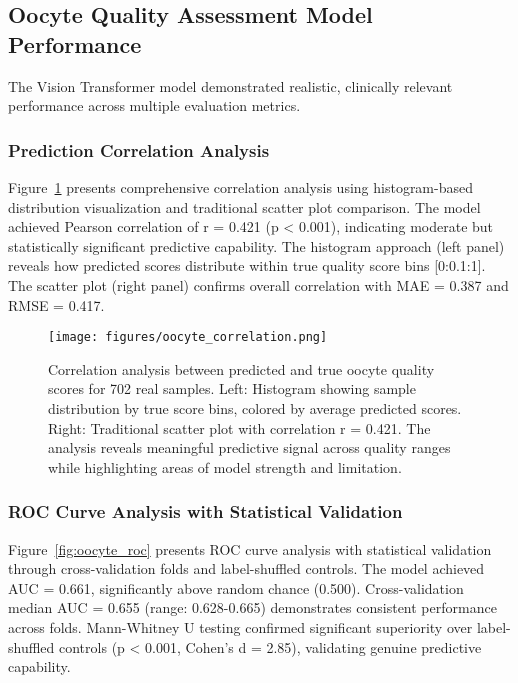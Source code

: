 \documentclass[pdflatex,sn-basic]{sn-jnl}%
\begin{document}
\subsection{Oocyte Quality Assessment Model Performance}

The Vision Transformer model demonstrated realistic, clinically relevant performance across multiple evaluation metrics.

\subsubsection{Prediction Correlation Analysis}

Figure~\ref{fig:oocyte_correlation} presents comprehensive correlation analysis using histogram-based distribution visualization and traditional scatter plot comparison. The model achieved Pearson correlation of r = 0.421 (p < 0.001), indicating moderate but statistically significant predictive capability. The histogram approach (left panel) reveals how predicted scores distribute within true quality score bins [0:0.1:1]. The scatter plot (right panel) confirms overall correlation with MAE = 0.387 and RMSE = 0.417.

\begin{figure}[H]
    \centering
    \texttt{[image: figures/oocyte\_correlation.png]}
    \caption{Correlation analysis between predicted and true oocyte quality scores for 702 real samples. Left: Histogram showing sample distribution by true score bins, colored by average predicted scores. Right: Traditional scatter plot with correlation r = 0.421. The analysis reveals meaningful predictive signal across quality ranges while highlighting areas of model strength and limitation.}
    \label{fig:oocyte_correlation}
\end{figure}

\subsubsection{ROC Curve Analysis with Statistical Validation}

Figure~\ref{fig:oocyte_roc} presents ROC curve analysis with statistical validation through cross-validation folds and label-shuffled controls. The model achieved AUC = 0.661, significantly above random chance (0.500). Cross-validation median AUC = 0.655 (range: 0.628-0.665) demonstrates consistent performance across folds. Mann-Whitney U testing confirmed significant superiority over label-shuffled controls (p < 0.001, Cohen's d = 2.85), validating genuine predictive capability.
\end{document}
